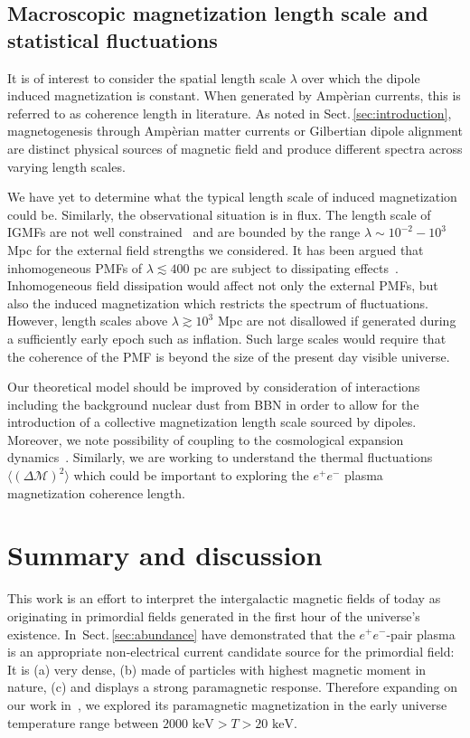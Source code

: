 \documentclass[aps,prd,floatfix,reprint]{revtex4-2}
\newcommand*{\keV}{\text{ keV}}
\newcommand{\rsec}[1]{Sect.\,{\ref{#1}}}
\newcommand*{\xblue}{\color{black}}
\begin{document}
{\xblue
\subsection{Macroscopic magnetization length scale and statistical fluctuations}
\label{sec:lengthscale}
\noindent It is of interest to consider the spatial length scale $\lambda$ over which the dipole induced magnetization is constant. When generated by Amp{\`e}rian currents, this is referred to as coherence length in literature. As noted in \rsec{sec:introduction}, magnetogenesis through Amp{\`e}rian matter currents or Gilbertian dipole alignment are distinct physical sources of magnetic field and produce different spectra across varying length scales.

We have yet to determine what the typical length scale of induced magnetization could be. Similarly, the observational situation is in flux. The length scale of IGMFs are not well constrained~\cite{Giovannini:2022rrl,Durrer:2013pga,AlvesBatista:2021sln} and are bounded by the range $\lambda\sim 10^{-2}-10^{3}$ Mpc for the external field strengths we considered. It has been argued that inhomogeneous PMFs of $\lambda  \lesssim400$ pc are subject to dissipating effects~\cite{Jedamzik:1999bm}. Inhomogeneous field dissipation would affect not only the external PMFs, but also the induced magnetization which restricts the spectrum of fluctuations. However, length scales above $\lambda\gtrsim10^{3}$ Mpc are not disallowed if generated during a sufficiently early epoch such as inflation. Such large scales would require that the coherence of the PMF is beyond the size of the present day visible universe.

Our theoretical model should be improved by consideration of interactions including the background nuclear dust from BBN in order to allow for the introduction of a collective magnetization length scale sourced by dipoles. Moreover, we note possibility of coupling to the cosmological expansion dynamics~\cite{Kahniashvili:2012uj}. Similarly, we are working to understand the thermal fluctuations $\langle(\Delta\mathcal{M})^{2}\rangle$ which could be important to exploring the $e^{+}e^{-}$ plasma magnetization coherence length.
}
\section{Summary and discussion}
\label{sec:conclusions}
\noindent This work is an effort to interpret the intergalactic magnetic fields of today as originating in primordial fields generated in the first hour of the universe's existence. In~\rsec{sec:abundance} have demonstrated that the $e^{+}e^{-}$-pair plasma is an appropriate non-electrical current candidate source for the primordial field: It is (a) very dense, (b) made of particles with highest magnetic moment in nature, (c) and displays a strong paramagnetic response. Therefore expanding on our work in~\cite{Rafelski:2023emw}, we explored its paramagnetic magnetization in the early universe temperature range between $2000\keV>T>20\keV$. 
\end{document}
